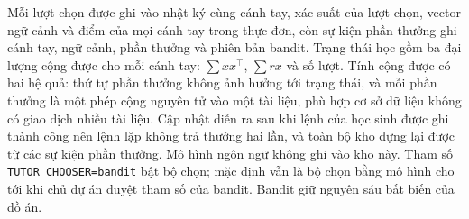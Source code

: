 Mỗi lượt chọn được ghi vào nhật ký cùng cánh tay, xác suất của lượt chọn, vector ngữ cảnh và điểm của mọi cánh tay trong thực đơn, còn sự kiện phần thưởng ghi cánh tay, ngữ cảnh, phần thưởng và phiên bản bandit. Trạng thái học gồm ba đại lượng cộng được cho mỗi cánh tay: $\sum xx^{\top}$, $\sum rx$ và số lượt. Tính cộng được có hai hệ quả: thứ tự phần thưởng không ảnh hưởng tới trạng thái, và mỗi phần thưởng là một phép cộng nguyên tử vào một tài liệu, phù hợp cơ sở dữ liệu không có giao dịch nhiều tài liệu. Cập nhật diễn ra sau khi lệnh của học sinh được ghi thành công nên lệnh lặp không trả thưởng hai lần, và toàn bộ kho dựng lại được từ các sự kiện phần thưởng. Mô hình ngôn ngữ không ghi vào kho này. Tham số \texttt{TUTOR\_CHOOSER=bandit} bật bộ chọn; mặc định vẫn là bộ chọn bằng mô hình cho tới khi chủ dự án duyệt tham số của bandit. Bandit giữ nguyên sáu bất biến của đồ án.
